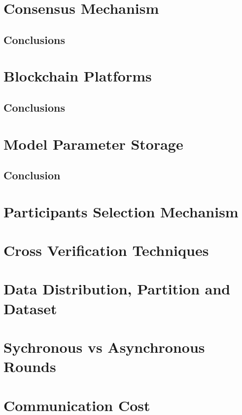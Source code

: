 \section{Consensus Mechanism}



\subsection{Conclusions}

\section{Blockchain Platforms}



\subsection{Conclusions}

\section{Model Parameter Storage}

\subsection{Conclusion}

\section{Participants Selection Mechanism}

\section{Cross Verification Techniques}

\section{Data Distribution, Partition and Dataset}



\section{Sychronous vs Asynchronous Rounds}

\section{Communication Cost}